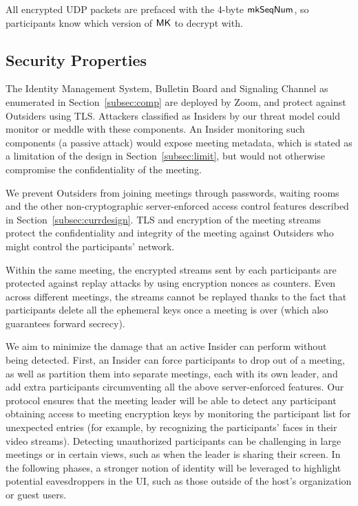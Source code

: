 All encrypted UDP packets are prefaced with the 4-byte $\mathsf{mkSeqNum}$, so participants know which version of ${\sf MK}$ to decrypt with.

\subsection{Security Properties}
\label{subsec:secprop}
The Identity Management System, Bulletin Board and Signaling Channel as enumerated in
Section~\ref{subsec:comp} are deployed by Zoom, and protect against Outsiders using TLS. Attackers
classified as Insiders by our threat model could monitor or meddle with these components. An Insider
monitoring such components (a passive attack) would expose meeting metadata, which is stated as a
limitation of the design in Section~\ref{subsec:limit}, but would not otherwise compromise the
confidentiality of the meeting.

We prevent Outsiders from joining meetings through passwords, waiting rooms and the other
non-cryptographic server-enforced access control features described in
Section~\ref{subsec:currdesign}. TLS and encryption of the meeting streams protect the
confidentiality and integrity of the meeting against Outsiders who might control the participants'
network.

Within the same meeting, the encrypted streams sent by each participants are protected against
replay attacks by using encryption nonces as counters. Even across different meetings, the streams
cannot be replayed thanks to the fact that participants delete all the ephemeral keys once a meeting
is over (which also guarantees forward secrecy). 

We aim to minimize the damage that an active Insider can perform without being detected. First, an
Insider can force participants to drop out of a meeting, as well as partition them into separate
meetings, each with its own leader, and add extra participants circumventing all the above
server-enforced features. Our protocol ensures that the meeting leader will be able to detect any
participant obtaining access to meeting encryption keys by monitoring the participant list for
unexpected entries (for example, by recognizing the participants' faces in their video streams).
Detecting unauthorized participants can be challenging in large meetings or in certain views, such
as when the leader is sharing their screen. In the following phases, a stronger notion of identity
will be leveraged to highlight potential eavesdroppers in the UI, such as those outside of the
host's organization or guest users.

